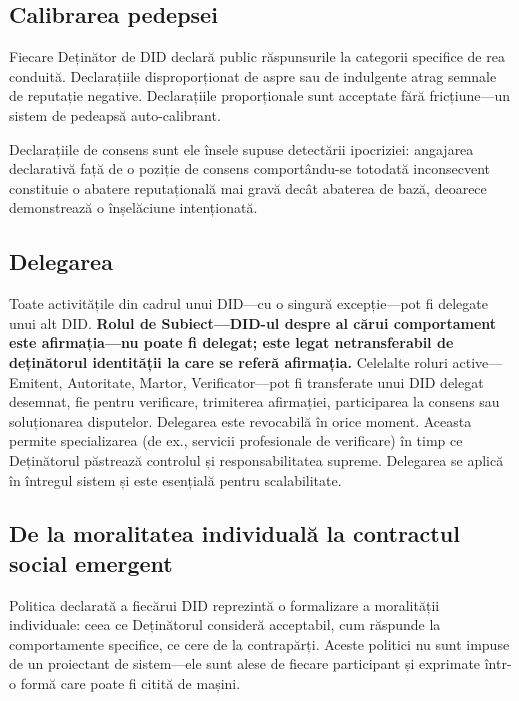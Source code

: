 \documentclass[11pt,a4paper,twocolumn]{article}
\begin{document}
\subsection{Calibrarea pedepsei}

Fiecare Deținător de DID declară public răspunsurile la categorii specifice de rea conduită. Declarațiile disproporționat de aspre sau de indulgente atrag semnale de reputație negative. Declarațiile proporționale sunt acceptate fără fricțiune---un sistem de pedeapsă auto-calibrant.

Declarațiile de consens sunt ele însele supuse detectării ipocriziei: angajarea declarativă față de o poziție de consens comportându-se totodată inconsecvent constituie o abatere reputațională mai gravă decât abaterea de bază, deoarece demonstrează o înșelăciune intenționată.

\subsection{Delegarea}

Toate activitățile din cadrul unui DID---cu o singură excepție---pot fi delegate unui alt DID. \textbf{Rolul de Subiect---DID-ul despre al cărui comportament este afirmația---nu poate fi delegat; este legat netransferabil de deținătorul identității la care se referă afirmația.} Celelalte roluri active---Emitent, Autoritate, Martor, Verificator---pot fi transferate unui DID delegat desemnat, fie pentru verificare, trimiterea afirmației, participarea la consens sau soluționarea disputelor. Delegarea este revocabilă în orice moment. Aceasta permite specializarea (de ex., servicii profesionale de verificare) în timp ce Deținătorul păstrează controlul și responsabilitatea supreme. Delegarea se aplică în întregul sistem și este esențială pentru scalabilitate.

\subsection{De la moralitatea individuală la contractul social emergent}

Politica declarată a fiecărui DID reprezintă o formalizare a moralității individuale: ceea ce Deținătorul consideră acceptabil, cum răspunde la comportamente specifice, ce cere de la contrapărți. Aceste politici nu sunt impuse de un proiectant de sistem---ele sunt alese de fiecare participant și exprimate într-o formă care poate fi citită de mașini.
\end{document}
